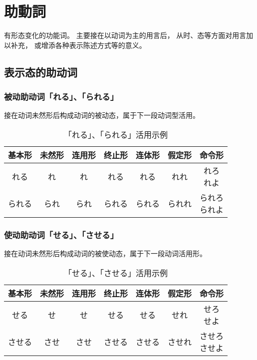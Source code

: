 \section{助動詞}%

有形态变化的功能词。
主要接在以动词为主的用言后，
从时、态等方面对用言加以补充，
或增添各种表示陈述方式等的意义。

\subsection{表示态的助动词}%

\subsubsection{被动助动词「れる」、「られる」}%

接在动词未然形后构成动词的被动态，属于下一段动词型活用。

\begin{table}[h]
  \centering
  \caption{「れる」、「られる」活用示例}
  \begin{tabular}{c c c c c c c}
    基本形 & 未然形 & 连用形 & 终止形 & 连体形 & 假定形 & 命令形 \\
    \hline
    れる & れ & れ & れる & れる & れれ & \makecell{れろ \\ れよ} \\
    られる & られ & られ & られる & られる & られれ & \makecell{られろ \\ られよ} \\
  \end{tabular}
\end{table}

\subsubsection{使动助动词「せる」、「させる」}%

接在动词未然形后构成动词的被使动态，属于下一段动词活用形。

\begin{table}[h]
  \centering
  \caption{「せる」、「させる」活用示例}
  \begin{tabular}{c c c c c c c}
    基本形 & 未然形 & 连用形 & 终止形 & 连体形 & 假定形 & 命令形 \\
    \hline
    せる & せ & せ & せる & せる & せれ & \makecell{せろ \\ せよ} \\
    させる & させ & させ & させる & させる & させれ & \makecell{させろ \\ させよ} \\
  \end{tabular}
\end{table}


